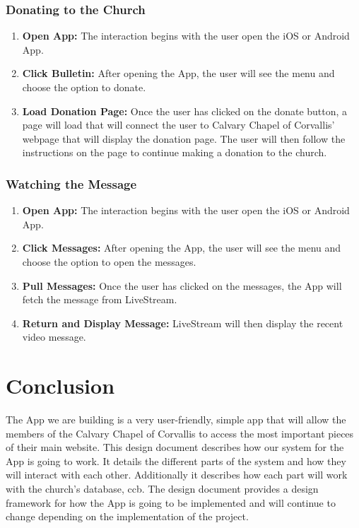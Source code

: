 \documentclass[letterpaper,10pt,draftclsnofoot,onecolumn,titlepage]{IEEEtran}
\begin{document}
			\subsubsection{Donating to the Church}
				\begin{enumerate}
					\item \textbf{Open \Gls{App}:} The interaction begins with the user open the \gls{iOS} or \gls{Android} \gls{App}.
					\item \textbf{Click Bulletin:} After opening the \gls{App}, the user will see the menu and choose the option to donate.
					\item \textbf{Load Donation Page:} Once the user has clicked on the donate button, a page will load that will connect the user to Calvary Chapel of Corvallis' webpage that will display the donation page.
					The user will then follow the instructions on the page to continue making a donation to the church.
				\end{enumerate}

			\subsubsection{Watching the Message}
				\begin{enumerate}
					\item \textbf{Open \Gls{App}:} The interaction begins with the user open the \gls{iOS} or \gls{Android} \gls{App}.
					\item \textbf{Click Messages:} After opening the \gls{App}, the user will see the menu and choose the option to open the messages.
					\item \textbf{Pull Messages:} Once the user has clicked on the messages, the \gls{App} will fetch the message from LiveStream.
					\item \textbf{Return and Display Message:} LiveStream will then display the recent video message.
				\end{enumerate}




	\section{Conclusion}
		The \gls{App} we are building is a very user-friendly, simple app that will allow the members of the Calvary Chapel of Corvallis to access the most important pieces of their main website.
		This design document describes how our system for the \gls{App} is going to work.
		It details the different parts of the system and how they will interact with each other.
		Additionally it describes how each part will work with the church's database, \gls{ccb}.
		The design document provides a design framework for how the \gls{App} is going to be implemented and will continue to change depending on the implementation of the project.
\end{document}
